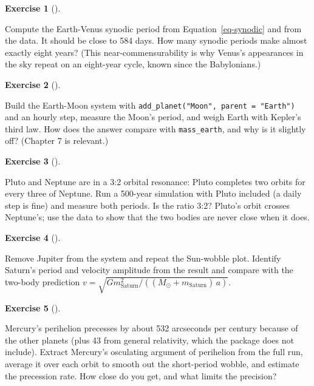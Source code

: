\documentclass[
  10.5pt,
  letterpaper,
]{scrbook}
\theoremstyle{definition}
\newtheorem{exercise}{Exercise}[chapter]
\theoremstyle{plain}
\theoremstyle{remark}
\begin{document}

\begin{exercise}[]\protect\hypertarget{exr-ch8-venus}{}\label{exr-ch8-venus}

Compute the Earth-Venus synodic period from Equation~\ref{eq-synodic}
and from the data. It should be close to 584 days. How many synodic
periods make almost exactly eight years? (This near-commensurability is
why Venus's appearances in the sky repeat on an eight-year cycle, known
since the Babylonians.)

\end{exercise}

\begin{exercise}[]\protect\hypertarget{exr-ch8-moon}{}\label{exr-ch8-moon}

Build the Earth-Moon system with
\texttt{add\_planet("Moon",\ parent\ =\ "Earth")} and an hourly step,
measure the Moon's period, and weigh Earth with Kepler's third law. How
does the answer compare with \texttt{mass\_earth}, and why is it
slightly off? (Chapter 7 is relevant.)

\end{exercise}

\begin{exercise}[]\protect\hypertarget{exr-ch8-pluto}{}\label{exr-ch8-pluto}

Pluto and Neptune are in a 3:2 orbital resonance: Pluto completes two
orbits for every three of Neptune. Run a 500-year simulation with Pluto
included (a daily step is fine) and measure both periods. Is the ratio
3:2? Pluto's orbit crosses Neptune's; use the data to show that the two
bodies are never close when it does.

\end{exercise}

\begin{exercise}[]\protect\hypertarget{exr-ch8-saturn}{}\label{exr-ch8-saturn}

Remove Jupiter from the system and repeat the Sun-wobble plot. Identify
Saturn's period and velocity amplitude from the result and compare with
the two-body prediction
\(v = \sqrt{G m_{\mathrm{Saturn}}^2 / ((M_\odot + m_{\mathrm{Saturn}})\, a)}\).

\end{exercise}

\begin{exercise}[]\protect\hypertarget{exr-ch8-mercury}{}\label{exr-ch8-mercury}

Mercury's perihelion precesses by about 532 arcseconds per century
because of the other planets (plus 43 from general relativity, which the
package does not include). Extract Mercury's osculating argument of
perihelion from the full run, average it over each orbit to smooth out
the short-period wobble, and estimate the precession rate. How close do
you get, and what limits the precision?

\end{exercise}
\end{document}
